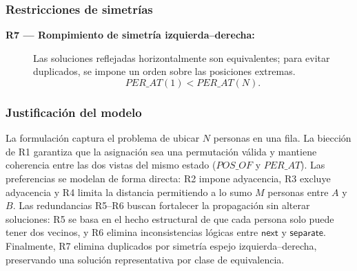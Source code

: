 \subsubsection*{Restricciones de simetrías}
\begin{description}
  \item[\textbf{R7 — Rompimiento de simetría izquierda–derecha:}] Las soluciones reflejadas horizontalmente son equivalentes; para evitar duplicados, se impone un orden sobre las posiciones extremas.  
  \[
  PER\_AT(1) < PER\_AT(N).
  \]
\end{description}

\subsubsection*{Justificación del modelo}
La formulación captura  el problema de ubicar \(N\) personas en una fila. La biección de R1 garantiza que la asignación sea una permutación válida y mantiene coherencia entre las dos vistas del mismo estado (\(POS\_OF\) y \(PER\_AT\)). Las preferencias se modelan de forma directa: R2 impone adyacencia, R3 excluye adyacencia y R4 limita la distancia permitiendo a lo sumo \(M\) personas entre \(A\) y \(B\). Las redundancias R5–R6 buscan fortalecer la propagación sin alterar soluciones: R5 se basa en el hecho estructural de que cada persona solo puede tener dos vecinos, y R6 elimina inconsistencias lógicas entre \(\textsf{next}\) y \(\textsf{separate}\). Finalmente, R7 elimina duplicados por simetría espejo izquierda–derecha, preservando una solución representativa por clase de equivalencia.